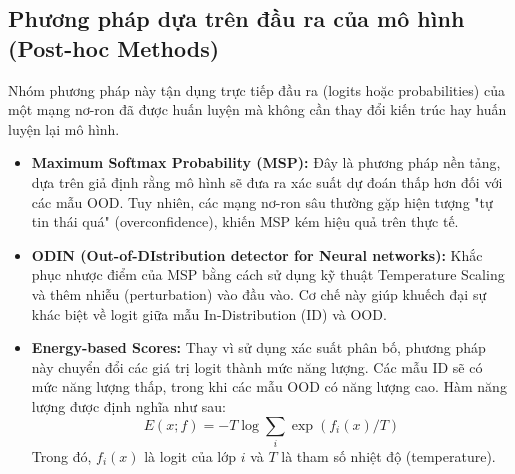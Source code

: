 \subsection{Phương pháp dựa trên đầu ra của mô hình (Post-hoc Methods)}
Nhóm phương pháp này tận dụng trực tiếp đầu ra (logits hoặc probabilities) của một mạng nơ-ron đã được huấn luyện 
mà không cần thay đổi kiến trúc hay huấn luyện lại mô hình.
\begin{itemize}
  \item \textbf{Maximum Softmax Probability (MSP):} 
  Đây là phương pháp nền tảng, dựa trên giả định rằng mô hình sẽ đưa ra xác suất dự đoán thấp hơn đối với các mẫu OOD. 
  Tuy nhiên, các mạng nơ-ron sâu thường gặp hiện tượng "tự tin thái quá" (overconfidence), khiến MSP kém hiệu quả trên thực tế.
  \item \textbf{ODIN (Out-of-DIstribution detector for Neural networks):} 
  Khắc phục nhược điểm của MSP bằng cách sử dụng kỹ thuật Temperature Scaling và thêm nhiễu (perturbation) vào đầu vào. 
  Cơ chế này giúp khuếch đại sự khác biệt về logit giữa mẫu In-Distribution (ID) và OOD.
  \item \textbf{Energy-based Scores:} Thay vì sử dụng xác suất phân bố, phương pháp này 
  chuyển đổi các giá trị logit thành mức năng lượng. Các mẫu ID sẽ có mức năng lượng thấp, 
  trong khi các mẫu OOD có năng lượng cao. Hàm năng lượng được định nghĩa như sau:
  $$E(x; f) = -T \log \sum_{i} \exp(f_i(x)/T)$$
  Trong đó, $f_i(x)$ là logit của lớp $i$ và $T$ là tham số nhiệt độ (temperature).
\end{itemize}

